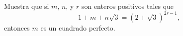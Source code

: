 Muestra que si $m$, $n$, y $r$ son enteros positivos tales que
\[1+m+n\sqrt 3 = \left(2+\sqrt 3\right)^{2r-1},\]
entonces $m$ es un cuadrado perfecto.